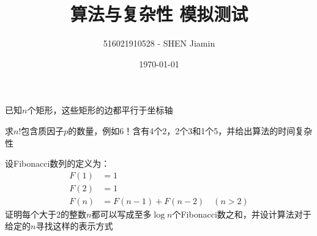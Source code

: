 \documentclass[answers]{exam}
\title{算法与复杂性 \quad 模拟测试}
\author{516021910528 - SHEN Jiamin}
\date{\today}
\begin{document}
\maketitle

\begin{questions}

    \question 已知$n$个矩形，这些矩形的边都平行于坐标轴

    \question 求$n!$包含质因子$p$的数量，例如$6！$含有4个2，2个3和1个5，并给出算法的时间复杂性
    \begin{solution}
    \end{solution}

    \question 设Fibonacci数列的定义为：
    \begin{align*}
        F(1) &=1 \\
        F(2) &=1 \\
        F(n) &=F(n-1)+F(n-2) \quad (n>2)
    \end{align*}
    证明每个大于$2$的整数$n$都可以写成至多$\log n$个Fibonacci数之和，并设计算法对于给定的$n$寻找这样的表示方式
    \begin{solution}
    \end{solution}

\end{questions}
\end{document}

